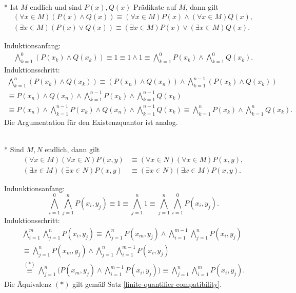 \newpage
\begin{Satz}[Verträglichkeitsgesetze]%
\label{finite-quantifier-compatibility}\mbox{}\\*
Ist $M$ endlich und sind $P(x),Q(x)$ Prädikate auf $M$, dann gilt
\begin{align*}
(\forall x\in M)(P(x)\land Q(x)) \equiv (\forall x\in M)P(x)\land(\forall x\in M)Q(x),\\
(\exists x\in M)(P(x)\lor Q(x)) \equiv (\exists x\in M)P(x)\lor(\exists x\in M)Q(x).
\end{align*}
\end{Satz}
 Induktionsanfang:
\begin{gather*}
\bigwedge_{k=1}^0 (P(x_k)\land Q(x_k)) \equiv 1 \equiv 1\land 1
\equiv \bigwedge_{k=1}^0 P(x_k)\land\bigwedge_{k=1}^0 Q(x_k).
\end{gather*}
Induktionsschritt:
\begin{gather*}
\bigwedge_{k=1}^n (P(x_k)\land Q(x_k))
\equiv (P(x_n)\land Q(x_n))\land\bigwedge_{k=1}^{n-1} (P(x_k)\land Q(x_k))\\
\equiv P(x_n)\land Q(x_n)\land\bigwedge_{k=1}^{n-1} P(x_k)\land\bigwedge_{k=1}^{n-1} Q(x_k)\\
\equiv P(x_n)\land\bigwedge_{k=1}^{n-1} P(x_k)\land Q(x_n)\land\bigwedge_{k=1}^{n-1} Q(x_k)
\equiv \bigwedge_{k=1}^n P(x_k)\land\bigwedge_{k=1}^n Q(x_k).
\end{gather*}
Die Argumentation für den Existenzquantor ist analog.\;\qedsymbol

\begin{Satz}\mbox{}\\*
Sind $M,N$ endlich, dann gilt
\begin{align*}
(\forall x\in M)(\forall x\in N)P(x,y)&\equiv (\forall x\in N)(\forall x\in M)P(x,y),\\
(\exists x\in M)(\exists x\in N)P(x,y)&\equiv (\exists x\in N)(\exists x\in M)P(x,y).
\end{align*}
\end{Satz}
Indunktionsanfang:
\[\bigwedge_{i=1}^0\bigwedge_{j=1}^n P(x_i,y_j)
\equiv 1 \equiv \bigwedge_{j=1}^n 1 \equiv
\bigwedge_{j=1}^n\bigwedge_{i=1}^0 P(x_i,y_j).\]
Induktionsschritt:
\begin{gather*}
\bigwedge_{i=1}^m\bigwedge_{j=1}^n P(x_i,y_j)
\equiv \bigwedge_{j=1}^n P(x_m,y_j)\land\bigwedge_{i=1}^{m-1}\bigwedge_{j=1}^n P(x_i,y_j)\\
\equiv \bigwedge_{j=1}^n P(x_m,y_j)\land\bigwedge_{j=1}^n \bigwedge_{i=1}^{m-1} P(x_i,y_j)\\
\stackrel{(*)}\equiv \bigwedge_{j=1}^n \bigg(P(x_m,y_j)\land\bigwedge_{i=1}^{m-1} P(x_i,y_j)\bigg)
\equiv \bigwedge_{j=1}^n \bigwedge_{i=1}^m P(x_i,y_j).
\end{gather*}
Die Äquivalenz $(*)$ gilt gemäß Satz \ref{finite-quantifier-compatibility}.

